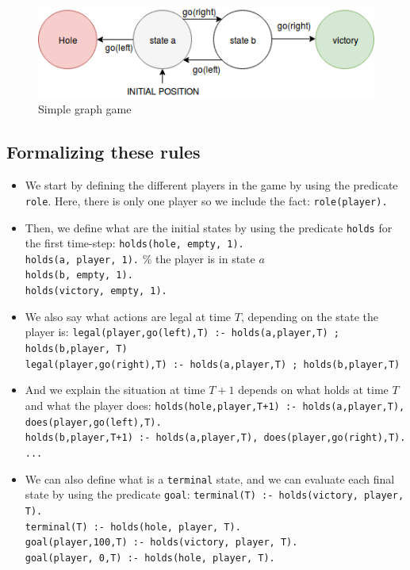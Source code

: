 \begin{figure}[h]
\centering
\includegraphics[width = 0.8\hsize]{diagram1.png}
\caption{Simple graph game}
\label{fig:agent}
\end{figure}

\subsection{Formalizing these rules}

\begin{itemize}



\item We start by defining the different players in the game by using the predicate \texttt{role}. Here, there is only one player so we include the fact: \texttt{role(player).}

\smallskip

\item Then, we define what are the initial states by using the predicate \texttt{holds} for the first time-step:\newline
\texttt{holds(hole, empty, 1).}\\
\texttt{holds(a, player, 1).} \% the player is in state $a$\\
\texttt{holds(b, empty, 1).}\\
\texttt{holds(victory, empty, 1).}

\item We also say what actions are legal at time $T$, depending on the state the player is:\newline
\texttt{legal(player,go(left),T) :- holds(a,player,T) ; holds(b,player, T)}\\
\texttt{legal(player,go(right),T) :- holds(a,player,T) ; holds(b,player,T)}

\item And we explain the situation at time $T+1$ depends on what holds at time $T$ and what the player does:\newline
\texttt{holds(hole,player,T+1) :- holds(a,player,T), does(player,go(left),T).}\\
\texttt{holds(b,player,T+1) :- holds(a,player,T), does(player,go(right),T).}\\
\texttt{...}

\item We can also define what is a \texttt{terminal} state, and we can evaluate each final state by using the predicate \texttt{goal}: \newline
\texttt{terminal(T) :- holds(victory, player, T).}\\
\texttt{terminal(T) :- holds(hole, player, T).}\\
\texttt{goal(player,100,T) :- holds(victory, player, T).}\\
\texttt{goal(player,  0,T) :- holds(hole, player, T).}
\end{itemize}

